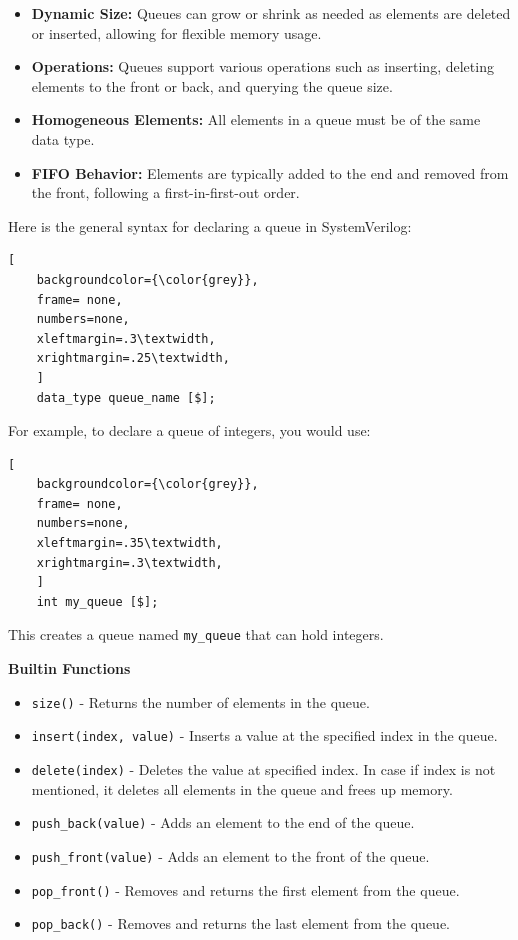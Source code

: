 \documentclass[12pt, a4paper]{article}
\begin{document}
\begin{itemize}[nosep]
    \item \textbf{Dynamic Size:} Queues can grow or shrink as needed as elements are deleted or inserted, allowing for flexible memory usage.

    \item \textbf{Operations:} Queues support various operations such as inserting, deleting elements to the front or back, and  querying the queue size.

    \item \textbf{Homogeneous Elements:} All elements in a queue must be of the same data type.
    \item \textbf{FIFO Behavior:} Elements are typically added to the end and removed from the front, following a first-in-first-out order.
\end{itemize}

Here is the general syntax for declaring a queue in SystemVerilog:
\begin{lstlisting}[
    backgroundcolor={\color{grey}},
    frame= none,
    numbers=none,
    xleftmargin=.3\textwidth,
    xrightmargin=.25\textwidth, 
    ]
    data_type queue_name [$];
\end{lstlisting}

For example, to declare a queue of integers, you would use:
\begin{lstlisting}[
    backgroundcolor={\color{grey}},
    frame= none,
    numbers=none,
    xleftmargin=.35\textwidth,
    xrightmargin=.3\textwidth, 
    ]
    int my_queue [$];
\end{lstlisting}
This creates a queue named \texttt{my\_queue} that can hold integers.

\textbf{Builtin Functions}

\vspace{0.2em}

\begin{itemize}[nosep]
    \item \texttt{size()} - Returns the number of elements in the queue.
    \item \texttt{insert(index, value)} - Inserts a value at the specified index in the queue.
    \item \texttt{delete(index)} - Deletes the value at specified index. In case if index is not mentioned, it deletes all elements in the queue and frees up memory.
    \item \texttt{push\_back(value)} - Adds an element to the end of the queue.
    \item \texttt{push\_front(value)} - Adds an element to the front of the queue.
    \item \texttt{pop\_front()} - Removes and returns the first element from the queue.
    \item \texttt{pop\_back()} - Removes and returns the last element from the queue.
\end{itemize}
\end{document}
